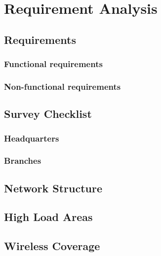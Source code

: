 \section{Requirement Analysis}
\subsection{Requirements}
\subsubsection{Functional requirements}

\subsubsection{Non-functional requirements}

\subsection{Survey Checklist}
\subsubsection{Headquarters}

\subsubsection{Branches}

\subsection{Network Structure}

\subsection{High Load Areas}

\subsection{Wireless Coverage}
